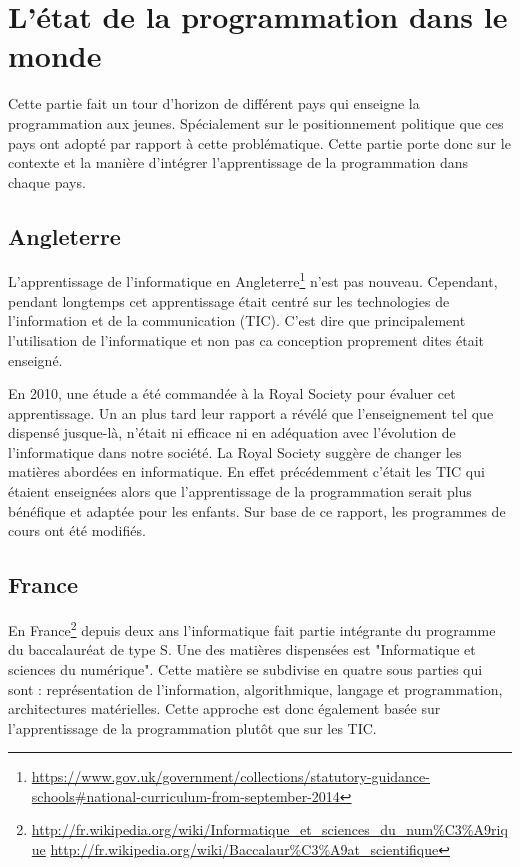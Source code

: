 \section{L'état de la programmation dans le monde}
\label{monde}
Cette partie fait un tour d'horizon de différent pays qui enseigne la programmation aux jeunes. Spécialement sur le positionnement politique que ces pays ont adopté par rapport à cette problématique. Cette partie porte donc sur le contexte et la manière d'intégrer l'apprentissage de la programmation dans chaque pays.
\subsection{Angleterre}
L'apprentissage de l'informatique en Angleterre\footnote{\url{https://www.gov.uk/government/collections/statutory-guidance-schools\#national-curriculum-from-september-2014}} n'est pas nouveau. Cependant, pendant longtemps cet apprentissage était centré sur les technologies de l'information et de la communication (TIC). C'est dire que principalement l'utilisation de l'informatique et non pas ca conception proprement dites était enseigné. 

En 2010, une étude a été commandée à la Royal Society pour évaluer cet apprentissage. Un an plus tard leur rapport a révélé que l'enseignement tel que dispensé jusque-là, n'était ni efficace ni en adéquation avec l'évolution de l'informatique dans notre société. La Royal Society suggère de changer les matières abordées en informatique. En effet précédemment c'était les TIC qui étaient enseignées alors que l'apprentissage de la programmation serait plus bénéfique et adaptée pour les enfants. Sur base de ce rapport, les programmes de cours ont été modifiés.

\subsection{France}
En France\footnote{\url{http://fr.wikipedia.org/wiki/Informatique\_et\_sciences\_du\_num\%C3\%A9rique}
\url{http://fr.wikipedia.org/wiki/Baccalaur\%C3\%A9at\_scientifique}} depuis deux ans l'informatique fait partie intégrante du programme du baccalauréat de type S. Une des matières dispensées est "Informatique et sciences du numérique". Cette matière se subdivise en quatre sous parties qui sont : représentation de l'information, algorithmique, langage et programmation, architectures matérielles. Cette approche est donc également basée sur l'apprentissage de la programmation plutôt que sur les TIC.

